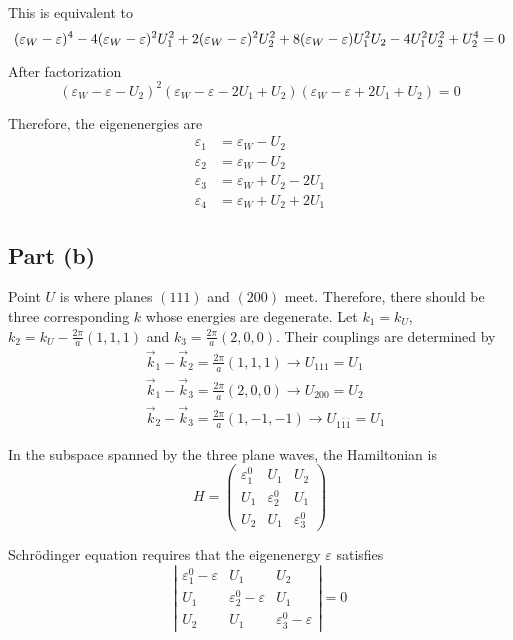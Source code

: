 \documentclass{article}
\begin{document}
This is equivalent to
\begin{equation*}
(\varepsilon_W-\varepsilon)^4-4(\varepsilon_W-\varepsilon)^2U_1^2+2(\varepsilon_W-\varepsilon)^2U_2^2+8(\varepsilon_W-\varepsilon)U_1^2U_2-4U_1^2U_2^2+U_2^4=0\\
\end{equation*}

After factorization
\begin{equation*}
(\varepsilon_W-\varepsilon-U_2)^2(\varepsilon_W-\varepsilon-2U_1+U_2)(\varepsilon_W-\varepsilon+2U_1+U_2)=0
\end{equation*}

Therefore, the eigenenergies are
\begin{align*}
\varepsilon_1&=\varepsilon_W-U_2\\
\varepsilon_2&=\varepsilon_W-U_2\\
\varepsilon_3&=\varepsilon_W+U_2-2U_1\\
\varepsilon_4&=\varepsilon_W+U_2+2U_1
\end{align*}

\subsection{Part (b)}
Point $U$ is where planes $(111)$ and $(200)$ meet. Therefore, there should be three corresponding $k$ whose energies are degenerate. Let $k_1=k_U$, $k_2=k_U-\frac{2\pi}{a}(1,1,1)$ and $k_3=\frac{2\pi}{a}(2,0,0)$. Their couplings are determined by
\begin{align*}
&\vec{k}_1-\vec{k}_2=\frac{2\pi}{a}(1,1,1)\rightarrow U_{111}=U_1\\
&\vec{k}_1-\vec{k}_3=\frac{2\pi}{a}(2,0,0)\rightarrow U_{200}=U_2\\
&\vec{k}_2-\vec{k}_3=\frac{2\pi}{a}(1,-1,-1)\rightarrow U_{1\bar{1}\bar{1}}=U_1
\end{align*}

In the subspace spanned by the three plane waves, the Hamiltonian is
\begin{equation*}
H=\left(\begin{array}{ccc}\varepsilon_1^0&U_1&U_2\\U_1&\varepsilon_2^0&U_1\\U_2&U_1&\varepsilon_3^0\end{array}\right)
\end{equation*}

Schr\"{o}dinger equation requires that the eigenenergy $\varepsilon$ satisfies
\begin{equation*}
\left|\begin{array}{ccc}\varepsilon_1^0-\varepsilon&U_1&U_2\\U_1&\varepsilon_2^0-\varepsilon&U_1\\U_2&U_1&\varepsilon_3^0-\varepsilon\end{array}\right|=0
\end{equation*}
\end{document}
